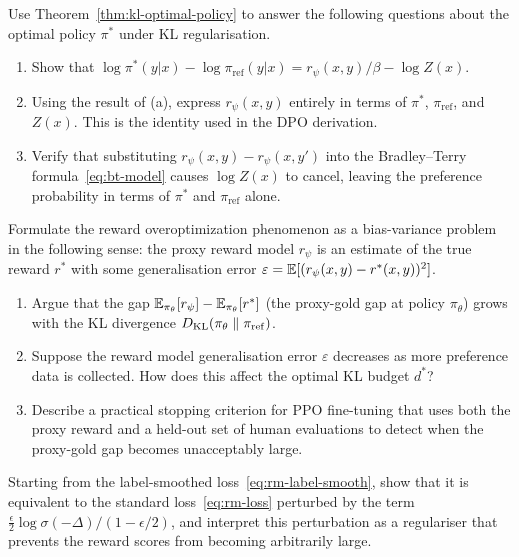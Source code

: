 \begin{exercise}
\label{ex:kl-optimal-policy}
Use Theorem~\ref{thm:kl-optimal-policy} to answer the following questions about the optimal policy $\pi^*$ under KL regularisation.
\begin{enumerate}
  \item Show that $\log\pi^*(y|x) - \log\pi_{\mathrm{ref}}(y|x) = r_\psi(x,y)/\beta - \log Z(x)$.
  \item Using the result of (a), express $r_\psi(x,y)$ entirely in terms of $\pi^*$, $\pi_{\mathrm{ref}}$, and $Z(x)$. This is the identity used in the DPO derivation.
  \item Verify that substituting $r_\psi(x,y) - r_\psi(x,y')$ into the Bradley--Terry formula~\eqref{eq:bt-model} causes $\log Z(x)$ to cancel, leaving the preference probability in terms of $\pi^*$ and $\pi_{\mathrm{ref}}$ alone.
\end{enumerate}
\end{exercise}

\begin{exercise}
\label{ex:goodhart}
Formulate the reward overoptimization phenomenon as a bias-variance problem in the following sense: the proxy reward model $r_\psi$ is an estimate of the true reward $r^*$ with some generalisation error $\varepsilon = \operatorname{\mathbb{E}}[(r_\psi(x,y) - r^*(x,y))^2]$.
\begin{enumerate}
  \item Argue that the gap $\operatorname{\mathbb{E}}_{\pi_\theta}[r_\psi] - \operatorname{\mathbb{E}}_{\pi_\theta}[r^*]$ (the proxy-gold gap at policy $\pi_\theta$) grows with the KL divergence $D_{\mathrm{KL}}\!\left(\pi_\theta\;\|\;\pi_{\mathrm{ref}}\right)$.
  \item Suppose the reward model generalisation error $\varepsilon$ decreases as more preference data is collected. How does this affect the optimal KL budget $d^*$?
  \item Describe a practical stopping criterion for PPO fine-tuning that uses both the proxy reward and a held-out set of human evaluations to detect when the proxy-gold gap becomes unacceptably large.
\end{enumerate}
\end{exercise}

\begin{exercise}
\label{ex:label-smoothing}
Starting from the label-smoothed loss~\eqref{eq:rm-label-smooth}, show that it is equivalent to the standard loss~\eqref{eq:rm-loss} perturbed by the term $\frac{\epsilon}{2}\log\sigma(-\Delta)/(1-\epsilon/2)$, and interpret this perturbation as a regulariser that prevents the reward scores from becoming arbitrarily large.
\end{exercise}

